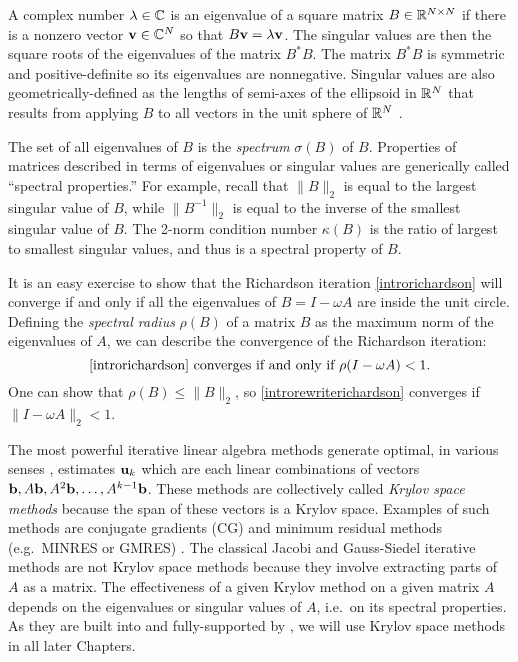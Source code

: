A complex number $\lambda \in \mathbb{C}$ is an eigenvalue of a square matrix $B\in\mathbb{R}^{N\times N}$ if there is a nonzero vector $\mathbf{v}\in\mathbb{C}^N$ so that $B \mathbf{v} = \lambda \mathbf{v}$.  The singular values are then the square roots of the eigenvalues of the matrix $B^*B$.  The matrix $B^*B$ is symmetric and positive-definite so its eigenvalues are nonnegative.  Singular values are also geometrically-defined as the lengths of semi-axes of the ellipsoid in $\mathbb{R}^N$ that results from applying $B$ to all vectors in the unit sphere of $\mathbb{R}^N$ \citep{TrefethenBau}.

The set of all eigenvalues of $B$ is the \emph{spectrum} $\sigma(B)$ of $B$.  Properties of matrices described in terms of eigenvalues or singular values are generically called ``spectral properties.''  For example, recall that $\|B\|_2$ is equal to the largest singular value of $B$, while $\|B^{-1}\|_2$ is equal to the inverse of the smallest singular value of $B$.  The 2-norm condition number $\kappa(B)$ is the ratio of largest to smallest singular values, and thus is a spectral property of $B$.

It is an easy exercise to show that the Richardson iteration \eqref{introrichardson} will converge if and only if all the eigenvalues of $B=I-\omega A$ are inside the unit circle.  Defining the \emph{spectral radius} $\rho(B)$ of a matrix $B$ as the maximum norm of the eigenvalues of $A$, we can describe the convergence of the Richardson iteration:
\begin{equation}
\text{\eqref{introrichardson} converges if and only if } \rho(I-\omega A) < 1. \label{introconvergethm}
\end{equation}
One can show that $\rho(B) \le \|B\|_2$, so \eqref{introrewriterichardson} converges if $\|I-\omega A\|_2 < 1$.

The most powerful iterative linear algebra methods generate optimal, in various senses \citep{TrefethenBau}, estimates $\mathbf{u}_k$ which are each linear combinations of vectors $\mathbf{b},A\mathbf{b},A^2\mathbf{b},\dots,A^{k-1}\mathbf{b}$.  These methods are collectively called \emph{Krylov space methods} because the span of these vectors is a Krylov space.  Examples of such methods are conjugate gradients (CG) and minimum residual methods (e.g.~MINRES or GMRES) \citep{Greenbaum1997,Saad2003}.  The classical Jacobi and Gauss-Siedel iterative methods are not Krylov space methods because they involve extracting parts of $A$ as a matrix.  The effectiveness of a given Krylov method on a given matrix $A$ depends on the eigenvalues or singular values of $A$, i.e.~on its spectral properties.  As they are built into and fully-supported by \PETSc, we will use Krylov space methods in all later Chapters.

